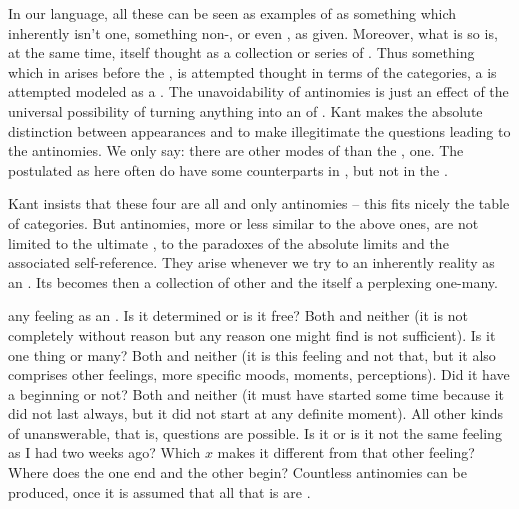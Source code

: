 In our language, all these can be seen as examples of  
as  something which inherently isn't one,  something
non-, or even 
, as  given. Moreover, what 
is so  is, at the same time, itself thought as a collection 
or series of . Thus something which in  
arises before the , is attempted thought 
in terms of the  categories, a  is attempted
modeled as a . The unavoidability of 
antinomies is just an effect of the universal possibility of turning 
anything into an  of . Kant makes the 
absolute distinction between appearances and  
to make illegitimate the questions leading to the antinomies. We only say: there
are other modes of  
 than the ,  one. The 
 postulated as here  often do have some counterparts 
in , but not in the . 

\pa
Kant insists that these four are all and only antinomies -- this 
fits nicely the table of categories. But antinomies, more or less similar to 
the above ones, are not limited to  the ultimate ,
to the paradoxes of the absolute limits and the associated
self-reference. They arise whenever we try to  an inherently 
 reality as an . Its  
becomes then a collection of other  and the  
itself a perplexing one-many. 

 any feeling as an . Is it determined or is it free?
Both and neither (it is not completely without reason but any reason one might
find is not sufficient). Is it one thing or many?  Both and neither (it is this
feeling and not that, but it also comprises other feelings, more specific moods,
moments, perceptions).  Did it have a beginning or not? Both and neither (it must
have started some time because it did not last always, but it did not start at
any definite moment). All other kinds of unanswerable, that is, 
questions are possible. Is it or is it not the same feeling as I had two weeks
ago? Which $x$ makes it different from that other feeling? Where does the one
end and the other begin? Countless antinomies can be produced, once it is
assumed that all that is are .

